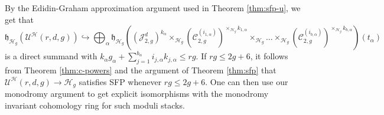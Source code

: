 \documentclass[11pt]{amsart}
\theoremstyle{definition}
\begin{document}
By the Edidin-Graham approximation argument used in Theorem \ref{thm:sfp-u}, we get that \begin{equation*}
    \mathfrak h_{\mathcal H_g} (\mathcal U^\mathcal H(r,d,g)) \hookrightarrow \bigoplus_{\alpha} \mathfrak h_{\mathcal H_g}  \left ( (\mathcal J_{2,g}^d)^{k_\alpha} \times_{\mathcal H_g}  (\mathcal C_{2,g}^{(i_{1,\alpha}) })^{\times_{\mathcal H_g}k_{1,\alpha}} \times _{\mathcal H_g} \dots  \times_{\mathcal H_g}(\mathcal C_{2,g}^{(i_{b,\alpha}) })^{\times_{\mathcal H_g}k_{b,\alpha}}   \right )(t_\alpha)
\end{equation*} is a direct summand with $k_\alpha g_\alpha + \sum_{j=1}^{b_{\alpha }} i_{j,\alpha}k_{j,\alpha} \leq rg $. If $rg\leq 2g+6$, it follows from Theorem \ref{thm:c-powers} and the argument of Theorem \ref{thm:sfp} that $\mathcal U^\mathcal H(r,d,g) \rightarrow \mathcal H_g$ satisfies SFP whenever $rg\leq 2g+6$. One can then use our monodromy argument to get explicit isomorphisms with the monodromy invariant cohomology ring for such moduli stacks. 

\

\end{document}
